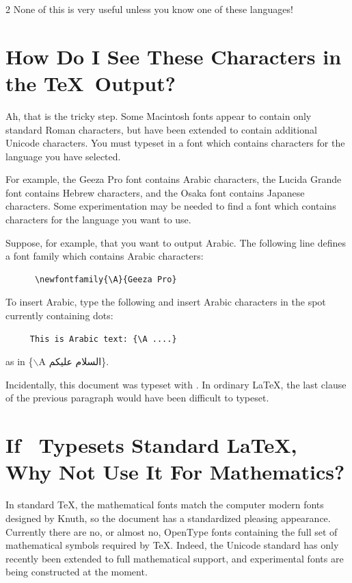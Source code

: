 \documentclass[11pt, oneside]{amsart}
\begin{document}
\begin{multicols}{2}
None of this is very useful unless you know one of these languages!

\section{How Do I See These Characters in the \TeX\ Output?}

Ah, that is the tricky step. Some Macintosh fonts appear to contain only standard Roman characters, but have been extended to contain additional Unicode characters.
You must typeset in a font which contains characters for the language you have selected.

For example, the Geeza Pro font contains Arabic characters, the Lucida Grande font contains Hebrew characters, and the Osaka font contains Japanese characters. Some experimentation may be needed to find a font which contains characters for the language you want to use. 

Suppose, for example, that you want to output Arabic. The following line defines a font family which contains Arabic characters:
\begin{verbatim}
      \newfontfamily{\A}{Geeza Pro}
\end{verbatim}

To insert Arabic, type the following and insert Arabic characters in the spot currently containing dots:
\begin{verbatim}
     This is Arabic text: {\A ....}
\end{verbatim}
as in \{$\backslash$A {\A السلام عليكم}\}.

Incidentally, this document was typeset with \XeLaTeX. In ordinary \LaTeX, the last clause of the previous paragraph would have been difficult to typeset.

\section{If \XeLaTeX\ Typesets Standard \LaTeX, Why Not Use It For Mathematics?}

In standard \TeX, the mathematical fonts match the computer modern fonts designed by Knuth, so the document has a standardized pleasing appearance. Currently there are no, or almost no, OpenType fonts containing the full set of mathematical symbols required by \TeX. Indeed, the Unicode standard has only recently been extended to full mathematical support, and experimental fonts are being constructed at the moment.


\end{multicols}
\end{document}
